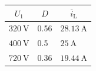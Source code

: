 \begin{solutiontable}[htb]
	\centering  %
	\begin{tabular}{lll}
		\toprule
		\multicolumn{1}{c}{$U_\mathrm{1}$} & \multicolumn{1}{c}{$D$} & \multicolumn{1}{c}{$\overline{i}_\mathrm{L}$} \\
		\midrule
		$\SI{320}{\volt}$                  & 0.56                    & $\SI{28.13}{\ampere}$                         \\
		$\SI{400}{\volt}$                  & 0.5                     & $\SI{25}{\ampere}$                            \\
		$\SI{720}{\volt}$                  & 0.36                    & $\SI{19.44}{\ampere}$                         \\
		\bottomrule
	\end{tabular}
	\caption{$D$ and $I_\mathrm{L}$ at $U_\mathrm{1}$.}
	\label{table:InductorCurrentDutyCycle}
\end{solutiontable}
